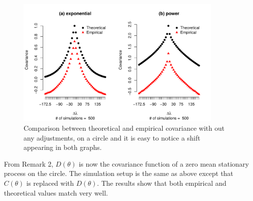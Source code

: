 
      \begin{figure}[H]
      	\label{covarince_circle}
      	\centering
       	\includegraphics[width=0.9\textwidth]{graphs/covarince_circle}
      	\caption {Comparison between theoretical and empirical covariance with out any adjustments, on a circle and it is easy to notice a shift appearing in both graphs.}
      \end{figure}

From Remark 2, $D(\theta)$ is now the covariance function of a zero mean stationary process on the circle. The simulation setup is the same as above except that $C(\theta)$ is replaced with $D(\theta)$. The results show that both empirical and theoretical values match very well. 

	      	
